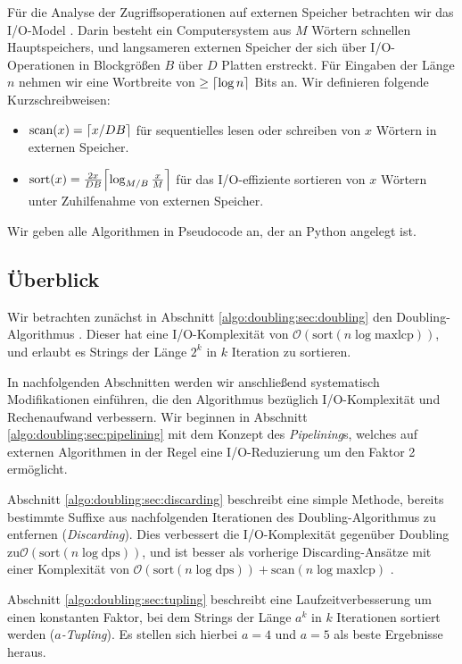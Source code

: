 Für die Analyse der Zugriffsoperationen auf externen Speicher betrachten wir das I/O-Model \cite{Vitter1994}. Darin besteht ein Computersystem aus $M$ Wörtern schnellen Hauptspeichers, und langsameren externen Speicher der sich über I/O-Operationen in Blockgrößen $B$ über $D$ Platten erstreckt. Für Eingaben der Länge $n$ nehmen wir eine Wortbreite von $\geq \ceil*{\log n}$ Bits an. Wir definieren folgende Kurzschreibweisen:
\begin{itemize}
\item $\text{scan}(x) = \ceil*{x/DB}$ für sequentielles lesen oder schreiben von $x$ Wörtern in externen Speicher.
\item $\text{sort}(x) = \frac{2x}{DB}\ceil*{\log_{M/B}\frac{x}{M}}$ für das I/O-effiziente sortieren von $x$ Wörtern unter Zuhilfenahme von externen Speicher.
\end{itemize}

Wir geben alle Algorithmen in Pseudocode an, der an Python angelegt ist.

\subsection{Überblick}

Wir betrachten zunächst in Abschnitt \ref{algo:doubling:sec:doubling} den Doubling-Algorithmus \cite{Arge1997}\cite{Crauser2002}. Dieser hat eine I/O-Komplexität von $\mathcal{O}(\text{sort}(n \log \text{maxlcp}))$, und erlaubt es Strings der Länge $2^k$ in $k$ Iteration zu sortieren.

In nachfolgenden Abschnitten werden wir anschließend systematisch Modifikationen einführen, die den Algorithmus bezüglich I/O-Komplexität und Rechenaufwand verbessern. Wir beginnen in Abschnitt \ref{algo:doubling:sec:pipelining} mit dem Konzept des \textit{Pipelining}s, welches auf externen Algorithmen in der Regel eine I/O-Reduzierung um den Faktor 2 ermöglicht.

Abschnitt \ref{algo:doubling:sec:discarding} beschreibt eine simple Methode, bereits bestimmte Suffixe aus nachfolgenden Iterationen des Doubling-Algorithmus zu entfernen (\textit{Discarding}). Dies verbessert die I/O-Komplexität gegenüber Doubling zu\newline $\mathcal{O}(\text{sort}(n \log \text{dps}))$, und ist besser als vorherige Discarding-Ansätze mit einer Komplexität von $\mathcal{O}(\text{sort}(n \log \text{dps})) + \text{scan}(n \log \text{maxlcp})$ \cite{Crauser2002}.

Abschnitt \ref{algo:doubling:sec:tupling} beschreibt eine Laufzeitverbesserung um einen konstanten Faktor, bei dem Strings der Länge $a^k$ in $k$ Iterationen sortiert werden (\textit{$a$-Tupling}). Es stellen sich hierbei $a = 4$ und $a = 5$ als beste Ergebnisse heraus.

